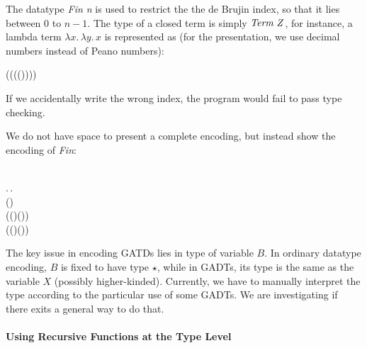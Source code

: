 The datatype \emph{Fin n} is used to restrict the the de Brujin index,
so that it lies between $0$ to $n - 1$. The type of a closed term is
simply \ensuremath{\Conid{Term}\;\Conid{Z}}, for instance, a lambda term
$\lambda x.\,\lambda y.\, x$ is represented as (for the presentation,
we use decimal numbers instead of Peano numbers):
\begin{hscode}\SaveRestoreHook
{}%
%
%
\>[3]{}\;\;(\;\;(\;\;(\;\;(\;)))){}\<[E]%
\ColumnHook
\end{hscode}\resethooks
If we accidentally write the wrong index, the program would fail to
pass type checking.


We do not have space to present a complete encoding, but instead show
the encoding of \emph{Fin}:
\begin{hscode}\SaveRestoreHook
{}%
%
%
%
%
\>[3]{}\;\mathbin{:}\to \star\mathrel{=}{}\<[E]%
\\
\>[3]{}\<[5]%
\>[5]{}\mu\;\mathbin{:}\to \star.\,\lambda {}\mathbin{:}.\,{}\<[E]%
\\
\>[5]{}\<[7]%
\>[7]{}(\mathbin{:}\to \star)\to {}\<[E]%
\\
\>[5]{}\<[7]%
\>[7]{}((\mathbin{:})\to {}\;(\;))\to {}\<[E]%
\\
\>[5]{}\<[7]%
\>[7]{}((\mathbin{:})\to {}\;\to {}\;(\;))\to {}\<[E]%
\\
\>[5]{}\<[7]%
\>[7]{}\;\<[E]%
\ColumnHook
\end{hscode}\resethooks
The key issue in encoding GATDs lies in type of variable $B$. In
ordinary datatype encoding, $B$ is fixed to have type $\star$, while
in GADTs, its type is the same as the variable $X$ (possibly
higher-kinded). Currently, we have to manually interpret the type
according to the particular use of some GADTs. We are investigating if
there exits a general way to do that.

\paragraph{Using Recursive Functions at the Type Level}
